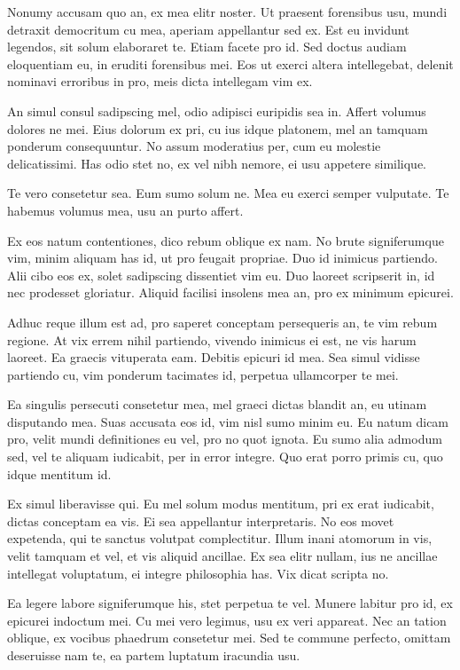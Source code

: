 \documentclass[twocolumn,twoside]{IEEEtran}
\begin{document}
 Nonumy accusam quo an, ex mea elitr noster. Ut praesent forensibus usu, mundi
 detraxit democritum cu mea, aperiam appellantur sed ex. Est eu invidunt
 legendos, sit solum elaboraret te. Etiam facete pro id. Sed doctus audiam
 eloquentiam eu, in eruditi forensibus mei. Eos ut exerci altera intellegebat,
 delenit nominavi erroribus in pro, meis dicta intellegam vim ex.

 An simul consul sadipscing mel, odio adipisci euripidis sea in. Affert volumus
 dolores ne mei. Eius dolorum ex pri, cu ius idque platonem, mel an tamquam
 ponderum consequuntur. No assum moderatius per, cum eu molestie delicatissimi.
 Has odio stet no, ex vel nibh nemore, ei usu appetere similique.

 Te vero consetetur sea. Eum sumo solum ne. Mea eu exerci semper vulputate. Te
 habemus volumus mea, usu an purto affert.

 Ex eos natum contentiones, dico rebum oblique ex nam. No brute signiferumque
 vim, minim aliquam has id, ut pro feugait propriae. Duo id inimicus partiendo.
 Alii cibo eos ex, solet sadipscing dissentiet vim eu. Duo laoreet scripserit
 in, id nec prodesset gloriatur. Aliquid facilisi insolens mea an, pro ex
 minimum epicurei.

 Adhuc reque illum est ad, pro saperet conceptam persequeris an, te vim rebum
 regione. At vix errem nihil partiendo, vivendo inimicus ei est, ne vis harum
 laoreet. Ea graecis vituperata eam. Debitis epicuri id mea. Sea simul vidisse
 partiendo cu, vim ponderum tacimates id, perpetua ullamcorper te mei.

 Ea singulis persecuti consetetur mea, mel graeci dictas blandit an, eu utinam
 disputando mea. Suas accusata eos id, vim nisl sumo minim eu. Eu natum dicam
 pro, velit mundi definitiones eu vel, pro no quot ignota. Eu sumo alia admodum
 sed, vel te aliquam iudicabit, per in error integre. Quo erat porro primis cu,
 quo idque mentitum id.

 Ex simul liberavisse qui. Eu mel solum modus mentitum, pri ex erat iudicabit,
 dictas conceptam ea vis. Ei sea appellantur interpretaris. No eos movet
 expetenda, qui te sanctus volutpat complectitur. Illum inani atomorum in vis,
 velit tamquam et vel, et vis aliquid ancillae. Ex sea elitr nullam, ius ne
 ancillae intellegat voluptatum, ei integre philosophia has. Vix dicat scripta
 no.

 Ea legere labore signiferumque his, stet perpetua te vel. Munere labitur pro
 id, ex epicurei indoctum mei. Cu mei vero legimus, usu ex veri appareat. Nec
 an tation oblique, ex vocibus phaedrum consetetur mei. Sed te commune
 perfecto, omittam deseruisse nam te, ea partem luptatum iracundia usu.
\end{document}
